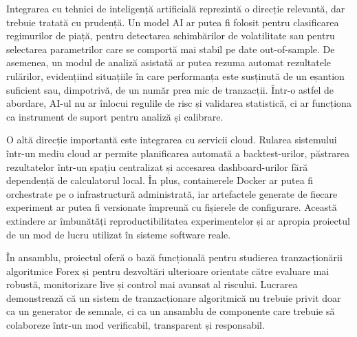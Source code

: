 Integrarea cu tehnici de inteligență artificială reprezintă o direcție relevantă, dar trebuie tratată cu prudență. Un model AI ar putea fi folosit pentru clasificarea regimurilor de piață, pentru detectarea schimbărilor de volatilitate sau pentru selectarea parametrilor care se comportă mai stabil pe date out-of-sample. De asemenea, un modul de analiză asistată ar putea rezuma automat rezultatele rulărilor, evidențiind situațiile în care performanța este susținută de un eșantion suficient sau, dimpotrivă, de un număr prea mic de tranzacții. Într-o astfel de abordare, AI-ul nu ar înlocui regulile de risc și validarea statistică, ci ar funcționa ca instrument de suport pentru analiză și calibrare.

O altă direcție importantă este integrarea cu servicii cloud. Rularea sistemului într-un mediu cloud ar permite planificarea automată a backtest-urilor, păstrarea rezultatelor într-un spațiu centralizat și accesarea dashboard-urilor fără dependență de calculatorul local. În plus, containerele Docker ar putea fi orchestrate pe o infrastructură administrată, iar artefactele generate de fiecare experiment ar putea fi versionate împreună cu fișierele de configurare. Această extindere ar îmbunătăți reproductibilitatea experimentelor și ar apropia proiectul de un mod de lucru utilizat în sisteme software reale.

În ansamblu, proiectul oferă o bază funcțională pentru studierea tranzacționării algoritmice Forex și pentru dezvoltări ulterioare orientate către evaluare mai robustă, monitorizare live și control mai avansat al riscului. Lucrarea demonstrează că un sistem de tranzacționare algoritmică nu trebuie privit doar ca un generator de semnale, ci ca un ansamblu de componente care trebuie să colaboreze într-un mod verificabil, transparent și responsabil.
